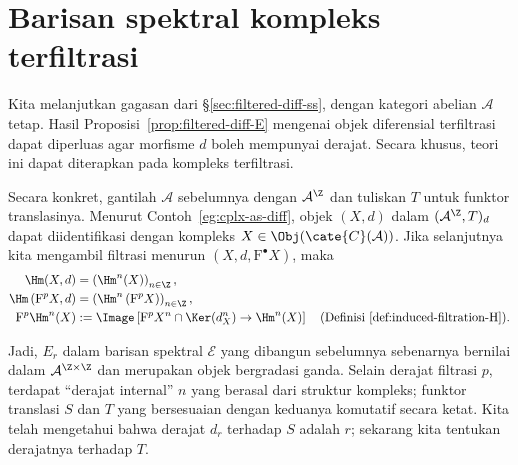 
\section{Barisan spektral kompleks terfiltrasi}\label{sec:filtered-cplx-ss}
\hypertarget{o014.aljabr2.chapter5.filtered-complex-spectral-sequence}{ }

Kita melanjutkan gagasan dari \S\ref{sec:filtered-diff-ss}, dengan kategori
abelian $\mathcal{A}$ tetap. Hasil
Proposisi~\ref{prop:filtered-diff-E} mengenai objek diferensial terfiltrasi
dapat diperluas agar morfisme $d$ boleh mempunyai derajat. Secara khusus,
teori ini dapat diterapkan pada kompleks terfiltrasi.

Secara konkret, gantilah $\mathcal{A}$ sebelumnya dengan
$\mathcal{A}^{\Z}$ dan tuliskan $T$ untuk funktor translasinya. Menurut
Contoh~\ref{eg:cplx-as-diff}, objek $(X,d)$ dalam
$(\mathcal{A}^{\Z},T)_d$ dapat diidentifikasi dengan kompleks
$X\in\Obj(\cate{C}(\mathcal{A}))$. Jika selanjutnya kita mengambil filtrasi
menurun $(X,d,\mathrm{F}^\bullet X)$, maka
\begin{align*}
	\Hm(X,d)&=\left(\Hm^n(X)\right)_{n\in\Z}, \\
	\Hm\left(\mathrm{F}^pX,d\right)
	&=\left(\Hm^n\left(\mathrm{F}^pX\right)\right)_{n\in\Z}, \\
	\mathrm{F}^p\Hm^n(X)&:=
	\Image\left[\mathrm{F}^pX^n\cap\Ker(d_X^n)\to\Hm^n(X)\right]
	\quad\text{(Definisi~\ref{def:induced-filtration-H}).}
\end{align*}

Jadi, $E_r$ dalam barisan spektral $\mathscr{E}$ yang dibangun sebelumnya
sebenarnya bernilai dalam $\mathcal{A}^{\Z\times\Z}$ dan merupakan objek
bergradasi ganda. Selain derajat filtrasi $p$, terdapat ``derajat internal''
$n$ yang berasal dari struktur kompleks; funktor translasi $S$ dan $T$ yang
bersesuaian dengan keduanya komutatif secara ketat. Kita telah mengetahui
bahwa derajat $d_r$ terhadap $S$ adalah $r$; sekarang kita tentukan derajatnya
terhadap $T$.


